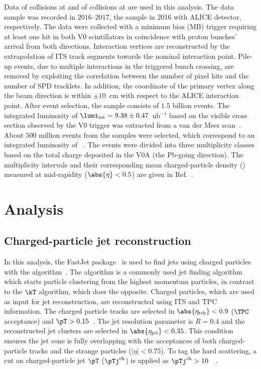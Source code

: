 \documentclass[ALICE,manyauthors]{cernphprep}
\begin{document}
Data of \pp collisions at \thirteen and of \pPb collisions at \fivenn are used in this analysis.
The \pp data sample was recorded in $2016$--$2017$, the \pPb sample in 2016 with ALICE detector, respectively.
The data were collected with a minimum bias (MB) trigger requiring at least one hit in both V0 scintillators in coincidence with proton bunches' arrival from both directions.
Interaction vertices are reconstructed by the extrapolation of ITS track segments towards the nominal interaction point.
Pile-up events, due to multiple interactions in the triggered bunch crossing, are removed by exploiting the correlation between the number of pixel hits and the number of SPD tracklets.
In addition, the coordinate of the primary vertex along the beam direction is within $\pm 10$~cm with respect to the ALICE interaction point.
After event selection, the \pp sample consists of $1.5$ billion events.
The integrated luminosity of $\lumi_{\rm int} = 9.38\pm 0.47$~nb$^{-1}$ based on the visible cross section observed by the V0 trigger was extracted from a van der Meer scan~\cite{ALICE-PUBLIC-2016-002}.
About $500$ million events from the \pPb samples were selected, which correspond to an integrated luminosity of ~\cite{collaboration_2014}.
The \pPb events were divided into three multiplicity classes based on the total charge deposited in the V0A (the Pb-going direction).
The multiplicity intervals and their corresponding mean charged-particle density (\dndeta) measured at mid-rapidity ($\abs{\eta} < 0.5$) are given in Ref.~\cite{Adam:2015pza}. 

\section{Analysis}%
\label{sec:Analysis}

\subsection{Charged-particle jet reconstruction}%
\label{sec:JetRec}

In this analysis, the FastJet package~\cite{Cacciari:2011ma} is used to find jets using charged particles with the \akT algorithm~\cite{Cacciari:2008gp}.
The \akT algorithm is a commonly used jet finding algorithm which starts particle clustering from the highest momentum particles, in contrast to the $\kT$ algorithm, which does the opposite.
Charged particles, which are used as input for jet reconstruction, are reconstructed using ITS and TPC information.
The charged particle tracks are selected in $\abs{\eta_{\rm trk}} < 0.9$ ($\TPC$ acceptance) and $\pT> 0.15$~\GeVc.
The jet resolution parameter is $R = 0.4$ and the reconstructed jet clusters are selected in $\abs{\eta_{\rm jet}} < 0.35$.
This condition ensures the jet cone is fully overlapping with the acceptances of both charged-particle tracks and the strange particles ($|\eta| < 0.75$).
To tag the hard scattering, a cut on charged-particle jet $\pT$ ($\pTj^{\rm ch}$) is applied as $\pTj^{\rm ch} > 10$~\GeVc~\cite{Acharya:2021oaa}.
\end{document}
